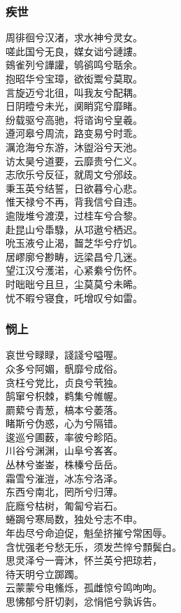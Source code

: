 \documentclass[]{article}
\begin{document}
\hypertarget{header-n380}{%
\subsubsection{疾世}\label{header-n380}}

周徘徊兮汉渚，求水神兮灵女。\\
嗟此国兮无良，媒女诎兮謰謱。\\
鴳雀列兮譁讙，鸲鹆鸣兮聒余。\\
抱昭华兮宝璋，欲衒鬻兮莫取。\\
言旋迈兮北徂，叫我友兮配耦。\\
日阴曀兮未光，阒睄窕兮靡睹。\\
纷载驱兮高驰，将谘询兮皇羲。\\
遵河皋兮周流，路变易兮时乖。\\
濿沧海兮东游，沐盥浴兮天池。\\
访太昊兮道要，云靡贵兮仁义。\\
志欣乐兮反征，就周文兮邠歧。\\
秉玉英兮结誓，日欲暮兮心悲。\\
惟天禄兮不再，背我信兮自违。\\
逾陇堆兮渡漠，过桂车兮合黎。\\
赴昆山兮馽騄，从邛遨兮栖迟。\\
吮玉液兮止渴，齧芝华兮疗饥。\\
居嵺廓兮尠畴，远梁昌兮几迷。\\
望江汉兮濩渃，心紧絭兮伤怀。\\
时昢昢兮且旦，尘莫莫兮未晞。\\
忧不暇兮寝食，吒增叹兮如雷。

\hypertarget{header-n385}{%
\subsubsection{悯上}\label{header-n385}}

哀世兮睩睩，諓諓兮嗌喔。\\
众多兮阿媚，骪靡兮成俗。\\
贪枉兮党比，贞良兮茕独。\\
鹄窜兮枳棘，鹈集兮帷幄。\\
罽蕠兮青葱，槁本兮萎落。\\
睹斯兮伪惑，心为兮隔错。\\
逡巡兮圃薮，率彼兮畛陌。\\
川谷兮渊渊，山阜兮峉峉。\\
丛林兮崟崟，株榛兮岳岳。\\
霜雪兮漼溰，冰冻兮洛泽。\\
东西兮南北，罔所兮归薄。\\
庇廕兮枯树，匍匐兮岩石。\\
蜷跼兮寒局数，独处兮志不申。\\
年齿尽兮命迫促，魁垒挤摧兮常困辱。\\
含忧强老兮愁无乐，须发苎悴兮顠鬓白。\\
思灵泽兮一膏沐，怀兰英兮把琼若，\\
待天明兮立踯躅。\\
云蒙蒙兮电鯈烁，孤雌惊兮鸣呴呴。\\
思怫郁兮肝切剥，忿悁悒兮孰诉告。
\end{document}
